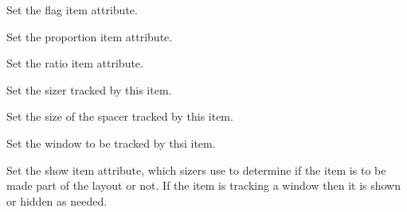 \label{wxsizeritemsetflag}


Set the flag  item attribute.


\label{wxsizeritemsetinitsize}



\label{wxsizeritemsetproportion}


Set the proportion item attribute.

\label{wxsizeritemsetratio}




Set the ratio item attribute.


\label{wxsizeritemsetsizer}


Set the sizer tracked by this item.


\label{wxsizeritemsetspacer}


Set the size of the spacer tracked by this item.


\label{wxsizeritemsetwindow}


Set the window to be tracked by thsi item.


\label{wxsizeritemshow}


Set the show item attribute, which sizers use to determine if the item
is to be made part of the layout or not.  If the item is tracking a
window then it is shown or hidden as needed.

